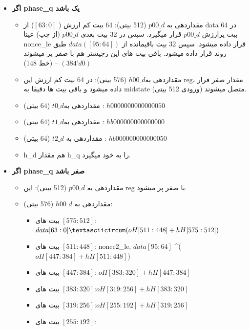 \begin{itemize}
	\item
	      \textbf{اگر phase\_q یک باشد}
	      \begin{itemize}
	      	\item
	      	      مقداردهی به $p00\_d$ (512 بیتی): 64 بیت کم ارزش ( $[63:0]$) از data در 64 بیت پرارزش $p00\_d$ قرار میگیرد. سپس در 32 بیت بعدی $p00\_d$ (از چپ) عینا nonce\_le قرار داده میشود. سپس 32 بیت باقیمانده از $data ([95:64])$ طبق روند قرار داده میشود. باقی بیت های این رجیستر هم با صفر پر میشوند $(384’d0)$ – (خط 148)
	      	\item
	      	      مقداردهی به$ h00\_d$ (576 بیتی): در 64 بیت کم ارزش این reg، مقدار صفر قرار داده میشود و باقی بیت ها دقیقا به midstate (ورودی 512 بیتی) متصل میشوند.
	      	\item
	      	      مقداردهی به$ t0\_d$ (64 بیتی) : $h0000000000000050$
	      	\item
	      	      مقداردهی به$ t1\_d$ (64 بیتی) : $hb000000000000000$
	      	\item
	      	      مقداردهی به $t2\_d$ (64 بیتی) : $hb000000000000050$
	      	\item
	      	      h\_d هم مقدار h\_q را به خود میگیرد.
	      \end{itemize}
	\item
\textbf{	      اگر phase\_q صفر باشد
}	      \begin{itemize}
	      	\item
	      	      مقداردهی به $p00\_d$ (512 بیتی): این reg با صفر پر میشود.
	      	\item
	      	      مقداردهی به $h00\_d$ (576 بیتی):
	      	      \begin{itemize}
	      	      	\item
	      	      	      بیت های $[575:512]$:	
	      	      	      	$data[63:0] \textasciicircum ( oH[511:448] + hH[575:512])$
	      	      	\item
	      	      	      بیت های $[511:448]$: 	{ nonce2\_le, $data[95:64]$ } \textasciicircum ( $oH[447:384] + hH[511:448]$)
	      	      	\item
	      	      	      بیت های $[447:384]$:  $	oH[383:320] + hH[447:384]$
	      	      	\item
	      	      	      بیت های $[383:320]$:$	oH[319:256] + hH[383:320]$
	      	      	\item
	      	      	      بیت های $[319:256]$:$	oH[255:192] + hH[319:256]$
	      	      	\item
	      	      	      بیت های $[255:192]$:

\end{itemize}
\end{itemize}
\end{itemize}

